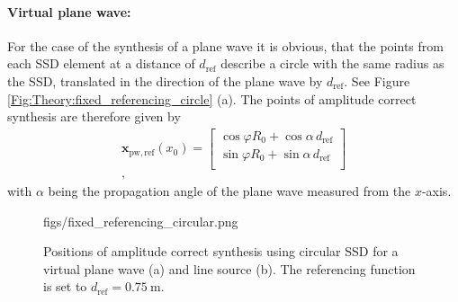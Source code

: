 \documentclass[12pt,a4paper]{article}
\newcommand{\sinfi}{\sin\varphi}
\newcommand{\cosfi}{\cos\varphi}
\newcommand{\dref}{d_{\mathrm{ref}}}
\begin{document}
\paragraph{Virtual plane wave:\\}
For the case of the synthesis of a plane wave it is obvious, that the points from each SSD element at a distance of $\dref$ describe a circle with the same radius as the SSD, translated in the direction of the plane wave by $\dref$. See Figure \ref{Fig:Theory:fixed_referencing_circle} (a). The points of amplitude correct synthesis are therefore given by
\begin{eqnarray}
\mathbf{x}_{\mathrm{pw,ref}}(x_0) =  \begin{bmatrix}  \cosfi R_0 + \cos\alpha \, \dref \\[0.3em] \sinfi R_0 + \sin \alpha \, \dref \\[0.3em]    \end{bmatrix} \\,
\label{Eq:Fixed_referencing_pw_circle}
\end{eqnarray}
with $\alpha$ being the propagation angle of the plane wave measured from the $x$-axis.

\begin{figure}
	\centering
	\begin{overpic}[width = 1\columnwidth]{figs/fixed_referencing_circular.png}
	\end{overpic}
\caption{ Positions of amplitude correct synthesis using circular SSD for a virtual plane wave (a) and line source (b). The referencing function is set to $\dref = 0.75~\mathrm{m}$. }
	\label{Fig:Theory:fixed_referencing_circular}
\end{figure}
\end{document}
